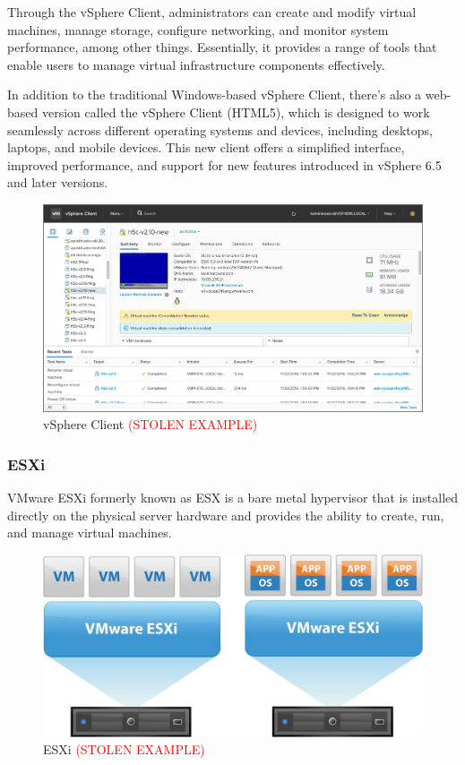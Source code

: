 Through the vSphere Client, administrators can create and modify virtual machines, manage storage, configure networking, and monitor system performance, among other things. Essentially, it provides a range of tools that enable users to manage virtual infrastructure components effectively.

In addition to the traditional Windows-based vSphere Client, there's also a web-based version called the vSphere Client (HTML5), which is designed to work seamlessly across different operating systems and devices, including desktops, laptops, and mobile devices. This new client offers a simplified interface, improved performance, and support for new features introduced in vSphere 6.5 and later versions.

\begin{figure}[H]
    \centering
    \includegraphics[scale = 0.9]{images/vsphere-client.jpg}
    \caption{vSphere Client \textcolor{red}{(STOLEN EXAMPLE)} }
    \label{vSphere Client}
\end{figure}

\subsubsection{ESXi}
VMware ESXi formerly known as ESX is a bare metal hypervisor that is installed directly on the physical server hardware and provides the ability to create, run, and manage virtual machines.

\begin{figure}[H]
    \centering
    \includegraphics[scale = 0.55]{images/esxi.jpg}
    \caption{ESXi \textcolor{red}{(STOLEN EXAMPLE)} }
    \label{ESXi}
\end{figure}


